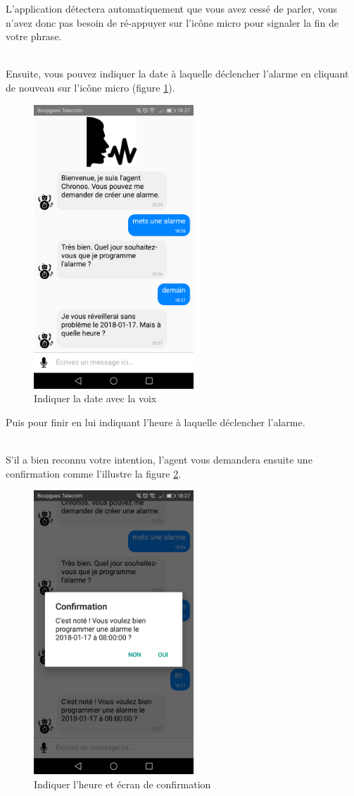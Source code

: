 L'application détectera automatiquement que vous avez cessé de parler, vous n'avez donc pas besoin de ré-appuyer sur l'icône micro pour signaler la fin de votre phrase.

~\\\indent Ensuite, vous pouvez indiquer la date à laquelle déclencher l'alarme en cliquant de nouveau sur l'icône micro (figure \ref{D}).

\begin{figure}[H]
  \centering
  \includegraphics[width=6cm]{images/D.png}
  \caption{Indiquer la date avec la voix}
  \label{D}
\end{figure}

Puis pour finir en lui indiquant l'heure à laquelle déclencher l'alarme.

~\\\indent S'il a bien reconnu votre intention, l'agent vous demandera ensuite une confirmation comme l'illustre la figure \ref{E}.

\begin{figure}[H]
  \centering
  \includegraphics[width=6cm]{images/E.png}
  \caption{Indiquer l'heure et écran de confirmation}
  \label{E}
\end{figure}


